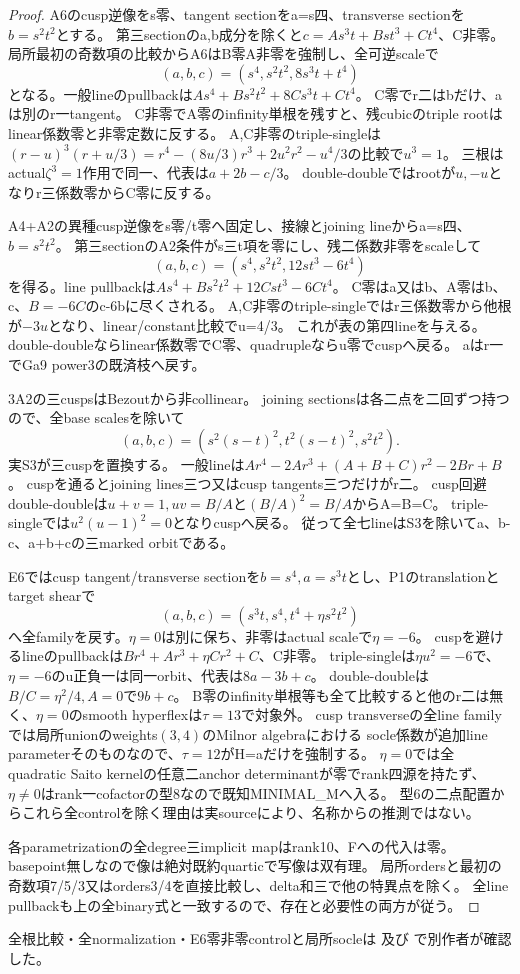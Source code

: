 \documentclass[a4paper,11pt]{ltjsarticle}
\theoremstyle{definition}
\begin{document}
\begin{proof}
A6のcusp逆像をs零、tangent sectionをa=s四、transverse sectionを$b=s^2t^2$とする。
第三sectionのa,b成分を除くと$c=A s^3t+Bst^3+Ct^4$、C非零。
局所最初の奇数項の比較からA6はB零A非零を強制し、全可逆scaleで
\[
 (a,b,c)=(s^4,s^2t^2,8s^3t+t^4)
\]
となる。一般lineのpullbackは$As^4+Bs^2t^2+8Cs^3t+Ct^4$。
C零でr二はbだけ、aは別のr一tangent。
C非零でA零のinfinity単根を残すと、残cubicのtriple rootはlinear係数零と非零定数に反する。
A,C非零のtriple-singleは
$(r-u)^3(r+u/3)=r^4-(8u/3)r^3+2u^2r^2-u^4/3$の比較で$u^3=1$。
三根はactual$\zeta^3=1$作用で同一、代表は$a+2b-c/3$。
double-doubleではrootが$u,-u$となりr三係数零からC零に反する。

A4+A2の異種cusp逆像をs零/t零へ固定し、接線とjoining lineからa=s四、$b=s^2t^2$。
第三sectionのA2条件がs三t項を零にし、残二係数非零をscaleして
\[
 (a,b,c)=(s^4,s^2t^2,12st^3-6t^4)
\]
を得る。line pullbackは$As^4+Bs^2t^2+12Cst^3-6Ct^4$。
C零はa又はb、A零はb、c、$B=-6C$のc-6bに尽くされる。
A,C非零のtriple-singleではr三係数零から他根が$-3u$となり、linear/constant比較でu=4/3。
これが表の第四lineを与える。double-doubleならlinear係数零でC零、quadrupleならu零でcuspへ戻る。
aはr一でGa9 power3の既済枝へ戻す。

3A2の三cuspsはBezoutから非collinear。
joining sectionsは各二点を二回ずつ持つので、全base scalesを除いて
\[
 (a,b,c)=(s^2(s-t)^2,t^2(s-t)^2,s^2t^2).
\]
実S3が三cuspを置換する。
一般lineは$Ar^4-2Ar^3+(A+B+C)r^2-2Br+B$。
cuspを通るとjoining lines三つ又はcusp tangents三つだけがr二。
cusp回避double-doubleは$u+v=1,uv=B/A$と$(B/A)^2=B/A$からA=B=C。
triple-singleでは$u^2(u-1)^2=0$となりcuspへ戻る。
従って全七lineはS3を除いてa、b-c、a+b+cの三marked orbitである。

E6ではcusp tangent/transverse sectionを$b=s^4,a=s^3t$とし、P1のtranslationとtarget shearで
\[
 (a,b,c)=(s^3t,s^4,t^4+\eta s^2t^2)
\]
へ全familyを戻す。$\eta=0$は別に保ち、非零はactual scaleで$\eta=-6$。
cuspを避けるlineのpullbackは$Br^4+Ar^3+\eta Cr^2+C$、C非零。
triple-singleは$\eta u^2=-6$で、$\eta=-6$のu正負一は同一orbit、代表は$8a-3b+c$。
double-doubleは$B/C=\eta^2/4,A=0$で$9b+c$。
B零のinfinity単根等も全て比較すると他のr二は無く、$\eta=0$のsmooth hyperflexは$\tau=13$で対象外。
cusp transverseの全line familyでは局所unionのweights$(3,4)$のMilnor algebraにおける
socle係数が追加line parameterそのものなので、$\tau=12$がH=aだけを強制する。
$\eta=0$では全quadratic Saito kernelの任意二anchor determinantが零でrank四源を持たず、
$\eta\ne0$はrank一cofactorの型8なので既知MINIMAL\_Mへ入る。
型6の二点配置からこれら全controlを除く理由は実sourceにより、名称からの推測ではない。

各parametrizationの全degree三implicit mapはrank10、Fへの代入は零。
basepoint無しなので像は絶対既約quarticで写像は双有理。
局所ordersと最初の奇数項7/5/3又はorders3/4を直接比較し、delta和三で他の特異点を除く。
全line pullbackも上の全binary式と一致するので、存在と必要性の両方が従う。
\end{proof}
全根比較・全normalization・E6零非零controlと局所socleは
及び
で別作者が確認した。
\end{document}
